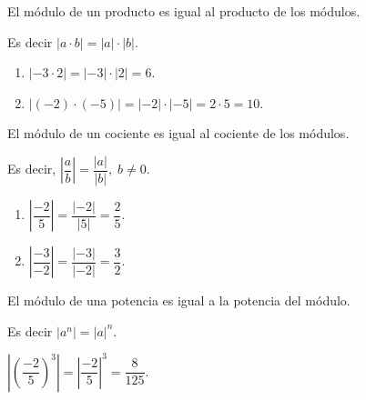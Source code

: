 \documentclass[oneside,english,spanish,2m,twoside,svgnames,x11names,HTML,twoside,12pt]{libro-matua}\usepackage[]{graphicx}\usepackage[]{color}
\begin{document}
\begin{propiedad}{}

El módulo de un producto es igual al producto de los módulos. 

\end{propiedad}

Es decir $\left|a\cdot b\right|=\left|a\right|\cdot\left|b\right|.$

\begin{ejemplos}
\begin{enumerate}
\item $\left|-3\cdot2\right|=\left|-3\right|\cdot\left|2\right|=6.$
\item $\left|\left(-2\right)\cdot\left(-5\right)\right|=\left|-2\right|\cdot\left|-5\right|=2\cdot5=10.$
\end{enumerate}
\end{ejemplos}

\begin{propiedad}{}

El módulo de un cociente es igual al cociente de los módulos.

\end{propiedad}

Es decir, $\left|\dfrac{a}{b}\right|=\dfrac{\left|a\right|}{\left|b\right|},\;b\neq0.$ 

\begin{ejemplos}
\begin{enumerate}
\item $\left|\dfrac{-2}{5}\right|=\dfrac{\left|-2\right|}{\left|5\right|}=\dfrac{2}{5}.$
\item $\left|\dfrac{-3}{-2}\right|=\dfrac{\left|-3\right|}{\left|-2\right|}=\dfrac{3}{2}.$
\end{enumerate}
\end{ejemplos}

\begin{propiedad}{}

El módulo de una potencia es igual a la potencia del módulo. 

\end{propiedad}

Es decir $\left|a^{n}\right|=\left|a\right|^{n}.$

\begin{ejemplo}

$\left|\left(\dfrac{-2}{5}\right)^{3}\right|=\left|\dfrac{-2}{5}\right|^{3}=\dfrac{8}{125}.$

\end{ejemplo}
\end{document}
